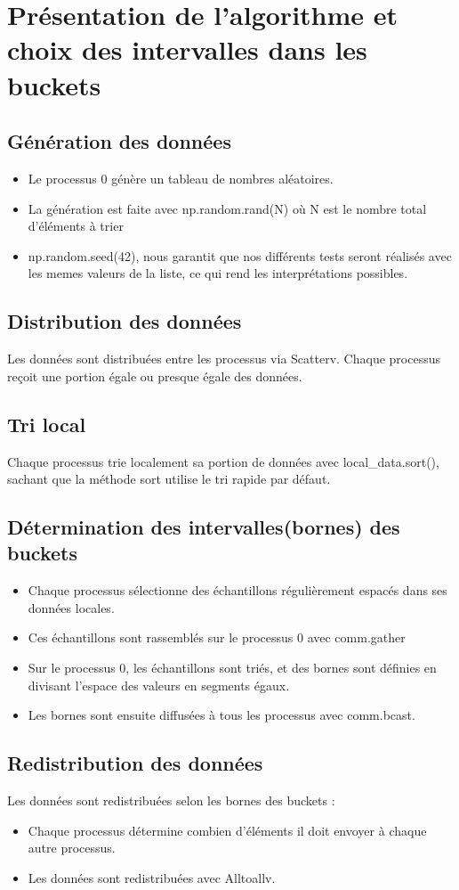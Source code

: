 \documentclass[a4paper,13pt]{book}
\begin{document}
\section{Présentation de l'algorithme et choix des intervalles dans les buckets}
\subsection{Génération des données}

\begin{itemize}
  \item Le processus 0 génère un tableau de nombres aléatoires.
  \item La génération est faite avec np.random.rand(N) où N est le nombre total d'éléments à trier
  \item np.random.seed(42), nous garantit que nos différents tests seront réalisés avec les memes valeurs de la liste, ce qui rend les interprétations possibles.
\end{itemize}
\subsection{Distribution des données}
Les données sont distribuées entre les processus via Scatterv. Chaque processus reçoit une portion égale ou presque égale des données.
\subsection{Tri local}
Chaque processus trie localement sa portion de données avec local\_data.sort(), sachant que la méthode sort utilise le tri rapide par défaut.
\subsection{Détermination des intervalles(bornes) des buckets}
 \begin{itemize}
  \item Chaque processus sélectionne des échantillons régulièrement espacés dans ses données locales.
  \item Ces échantillons sont rassemblés sur le processus 0 avec comm.gather
  \item Sur le processus 0, les échantillons sont triés, et des bornes sont définies en divisant l'espace des valeurs en segments égaux.
  \item Les bornes sont ensuite diffusées à tous les processus avec comm.bcast.
 \end{itemize}
 \subsection{Redistribution des données}
 Les données sont redistribuées selon les bornes des buckets :
 \begin{itemize}
  \item Chaque processus détermine combien d'éléments il doit envoyer à chaque autre processus.
  \item Les données sont redistribuées avec Alltoallv.
 \end{itemize}
\end{document}

